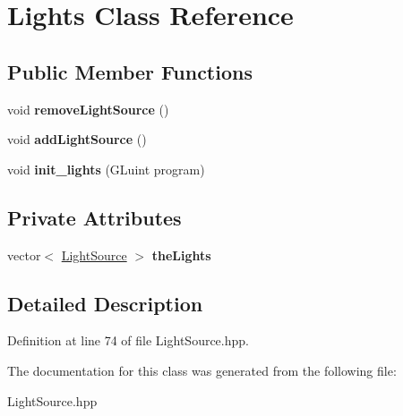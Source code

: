 \hypertarget{class_lights}{\section{Lights Class Reference}
\label{class_lights}
}
\subsection*{Public Member Functions}
\begin{DoxyCompactItemize}
\item 
\hypertarget{class_lights_a697efdeb33331a506a1a63a564f5f2e1}{void {\bfseries remove\-Light\-Source} ()}\label{class_lights_a697efdeb33331a506a1a63a564f5f2e1}

\item 
\hypertarget{class_lights_a2b773cfaba5c662fb2a0344be70edc19}{void {\bfseries add\-Light\-Source} ()}\label{class_lights_a2b773cfaba5c662fb2a0344be70edc19}

\item 
\hypertarget{class_lights_a47639f6fd64056f15b9372b80f9ef117}{void {\bfseries init\-\_\-lights} (G\-Luint program)}\label{class_lights_a47639f6fd64056f15b9372b80f9ef117}

\end{DoxyCompactItemize}
\subsection*{Private Attributes}
\begin{DoxyCompactItemize}
\item 
\hypertarget{class_lights_a902e37f0512d3bf9771472fe564bdac1}{vector$<$ \hyperlink{class_light_source}{Light\-Source} $>$ {\bfseries the\-Lights}}\label{class_lights_a902e37f0512d3bf9771472fe564bdac1}

\end{DoxyCompactItemize}


\subsection{Detailed Description}


Definition at line 74 of file Light\-Source.\-hpp.



The documentation for this class was generated from the following file\-:\begin{DoxyCompactItemize}
\item 
Light\-Source.\-hpp\end{DoxyCompactItemize}
